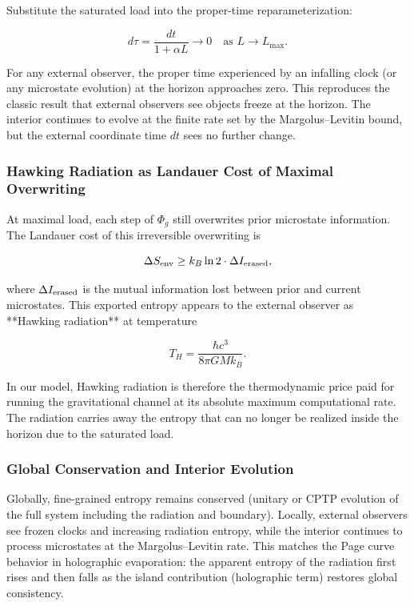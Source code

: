 \documentclass[reprint,amsmath,amssymb,aps,prd,preprintnumbers,superscriptaddress,longbibliography,10pt]{revtex4-2}
\begin{document}
Substitute the saturated load into the proper-time reparameterization:

$$
d\tau = \frac{dt}{1 + \alpha L} \to 0 \quad \text{as } L \to L_{\max}.
$$

For any external observer, the proper time experienced by an infalling clock (or any microstate evolution) at the horizon approaches zero. This reproduces the classic result that external observers see objects freeze at the horizon. The interior continues to evolve at the finite rate set by the Margolus–Levitin bound, but the external coordinate time $dt$ sees no further change.

\subsubsection{Hawking Radiation as Landauer Cost of Maximal Overwriting}

At maximal load, each step of $\Phi_g$ still overwrites prior microstate information. The Landauer cost of this irreversible overwriting is

$$
\Delta S_{\rm env} \geq k_B \ln 2 \cdot \Delta I_{\rm erased},
$$

where $\Delta I_{\rm erased}$ is the mutual information lost between prior and current microstates. This exported entropy appears to the external observer as **Hawking radiation** at temperature

$$
T_H = \frac{\hbar c^3}{8\pi G M k_B}.
$$

In our model, Hawking radiation is therefore the thermodynamic price paid for running the gravitational channel at its absolute maximum computational rate. The radiation carries away the entropy that can no longer be realized inside the horizon due to the saturated load.

\subsubsection{Global Conservation and Interior Evolution}

Globally, fine-grained entropy remains conserved (unitary or CPTP evolution of the full system including the radiation and boundary). Locally, external observers see frozen clocks and increasing radiation entropy, while the interior continues to process microstates at the Margolus–Levitin rate. This matches the Page curve behavior in holographic evaporation: the apparent entropy of the radiation first rises and then falls as the island contribution (holographic term) restores global consistency.
\end{document}
